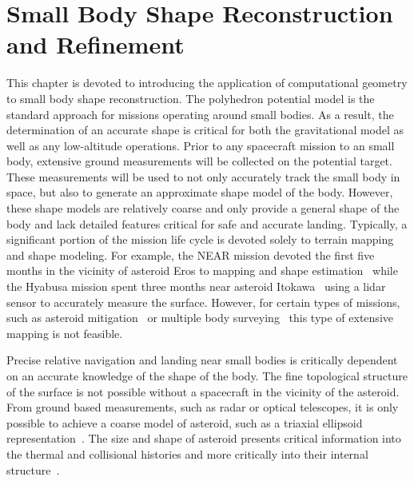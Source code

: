 
\chapter{Small Body Shape Reconstruction and Refinement}\label{sec:shape_reconstruction}

This chapter is devoted to introducing the application of computational geometry to small body shape reconstruction.
The polyhedron potential model is the standard approach for missions operating around small bodies.
As a result, the determination of an accurate shape is critical for both the gravitational model as well as any low-altitude operations.
Prior to any spacecraft mission to an small body, extensive ground measurements will be collected on the potential target.
These measurements will be used to not only accurately track the small body in space, but also to generate an approximate shape model of the body. 
However, these shape models are relatively coarse and only provide a general shape of the body and lack detailed features critical for safe and accurate landing.
Typically, a significant portion of the mission life cycle is devoted solely to terrain mapping and shape modeling.
For example, the NEAR mission devoted the first five months in the vicinity of asteroid Eros to mapping and shape estimation~\cite{antreasian2002} while the Hyabusa mission spent three months near asteroid Itokawa~\cite{barnouin-jha2008} using a \gls{lidar} sensor to accurately measure the surface.
However, for certain types of missions, such as asteroid mitigation~\cite{garshnek2000,pitz2014} or multiple body surveying~\cite{stuart2011a,stuart2016} this type of extensive mapping is not feasible.

Precise relative navigation and landing near small bodies is critically dependent on an accurate knowledge of the shape of the body.
The fine topological structure of the surface is not possible without a spacecraft in the vicinity of the asteroid.
From ground  based measurements, such as radar or optical telescopes, it is only possible to achieve a coarse model of asteroid, such as a triaxial ellipsoid representation~\cite{hudson1994}.
The size and shape of asteroid presents critical information into the thermal and collisional histories and more critically into their internal structure~\cite{cole1998}.

